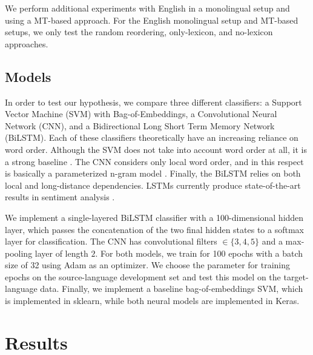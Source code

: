 \documentclass[11pt,a4paper]{article}
\begin{document}
We perform additional experiments with English in a monolingual setup and using a MT-based approach. For the English monolingual setup and MT-based setups, we only test the random reordering, only-lexicon, and no-lexicon approaches.

\subsection{Models}

In order to test our hypothesis, we compare three different classifiers: a Support Vector Machine (SVM) with Bag-of-Embeddings, a Convolutional Neural Network (CNN), and a Bidirectional Long Short Term Memory Network (BiLSTM). Each of these classifiers theoretically have an increasing reliance on word order. Although the SVM does not take into account word order at all, it is a strong baseline \cite{Kiritchenko2014c}. The CNN considers only local word order, and in this respect is basically a parameterized n-gram model \cite{Santos2014,Severyn2015,Barnes2017}. Finally, the BiLSTM relies on both local and long-distance dependencies. LSTMs currently produce state-of-the-art results in sentiment analysis \cite{Tai2015a,Barnes2017,Howard2018}. 

We implement a single-layered BiLSTM classifier with a 100-dimensional hidden layer, which passes the concatenation of the two final hidden states to a softmax layer for classification. The CNN has convolutional filters $\in \{3,4,5\}$ and a max-pooling layer of length $2$. For both models, we train for 100 epochs with a batch size of 32 using Adam as an optimizer. We choose the parameter for training epochs on the source-language development set and test this model on the target-language data. Finally, we implement a baseline bag-of-embeddings SVM, which is implemented in sklearn, while both neural models are implemented in Keras.

\section{Results}
\end{document}
